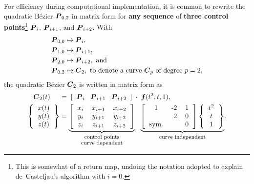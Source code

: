 For efficiency during computational implementation, 
it is common to rewrite the quadratic B\'ezier $\mbox{\boldmath $P$}_{0,2}$ 
in matrix form for {\bf any sequence} of {\bf three control 
points}\footnote{This is 
somewhat of a 
return map, undoing the notation adopted to
explain de~Casteljau's algorithm 
with $i = 0$.}
$\mbox{\boldmath $P$}_i$, $\mbox{\boldmath $P$}_{i+1}$, and $\mbox{\boldmath $P$}_{i+2}$.
With
\begin{align}
\mbox{\boldmath $P$}_{0,0} & \mapsto \mbox{\boldmath $P$}_i, \\
\mbox{\boldmath $P$}_{1,0} & \mapsto \mbox{\boldmath $P$}_{i+1}, \\
\mbox{\boldmath $P$}_{2,0} & \mapsto \mbox{\boldmath $P$}_{i+2}, \mbox{ and } \\
\mbox{\boldmath $P$}_{0,2} & \mapsto \mbox{\boldmath $C$}_2, \mbox{ to denote a curve } \mbox{\boldmath $C$}_p \mbox { of degree } p=2,
\end{align}
the quadratic B\'ezier $\mbox{\boldmath $C$}_2$ is written in matrix form as
\begin{align}
\vC_2(t) \;\;\;\;\; & = \; \left[\;\; \vP_i \;\;\; \vP_{i+1} \;\;\; 
\vP_{i+2} \;\; \right] 
\; \cdot \; \vf(t^2, t, 1),
\\
\left\{\begin{tabular}{c} $x(t)$ \\ $y(t)$ \\ $z(t)$ \end{tabular} \right\}
& = 
\underset{\underset{\mbox{\footnotesize curve dependent}}{\mbox{\footnotesize control points}}}{%
\underbrace{%
\left[\begin{tabular}{ccc} 
$x_i$ 
& 
$x_{i+1}$ 
& 
$x_{i+2}$ 
\\ 
$y_i$ 
& 
$y_{i+1}$ 
& 
$y_{i+2}$ 
\\ 
$z_i$ 
& 
$z_{i+1}$ 
& 
$z_{i+2}$ 
\end{tabular} \right]
}%
}%
%
\;\;\;
\underset{\mbox{\footnotesize curve independent}}{%
\underbrace{%
\left[\begin{tabular}{crr} 
1 
& 
-2
& 
1
\\ 
% 
& 
2
& 
0
\\ 
sym.
& 
%
& 
0
\end{tabular} \right]
%
\left\{\begin{tabular}{c} $t^2$ \\ $t$ \\ $1$ \end{tabular} \right\}
}%
}%
.
\end{align}



